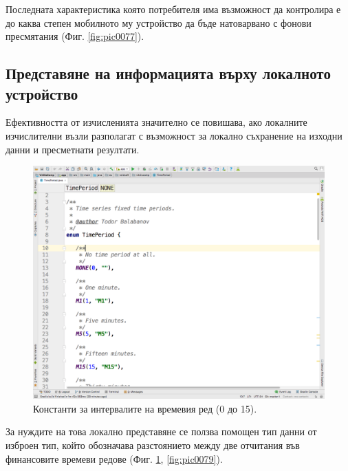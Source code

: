 \documentclass[book,14pt,oneside,openany]{memoir}
\begin{document}
Последната характеристика която потребителя има възможност да контролира е до каква степен мобилното му устройство да бъде натоварвано с фонови пресмятания (Фиг. \ref{fig:pic0077}).

\subsection{Представяне на информацията върху локалното устройство}

Ефективността от изчисленията значително се повишава, ако локалните изчислителни възли разполагат с възможност за локално съхранение на изходни данни и пресметнати резултати. 

\begin{figure}[h]
  \centering
  \includegraphics[height=0.45\pdfpageheight]{pic0078}
  \caption{Константи за интервалите на времевия ред (0 до 15).}
\label{fig:pic0078}
\end{figure}
\FloatBarrier

За нуждите на това локално представяне се ползва помощен тип данни от изброен тип, който обозначава разстоянието между две отчитания във финансовите времеви редове (Фиг. \ref{fig:pic0078}, \ref{fig:pic0079}).
\end{document}
